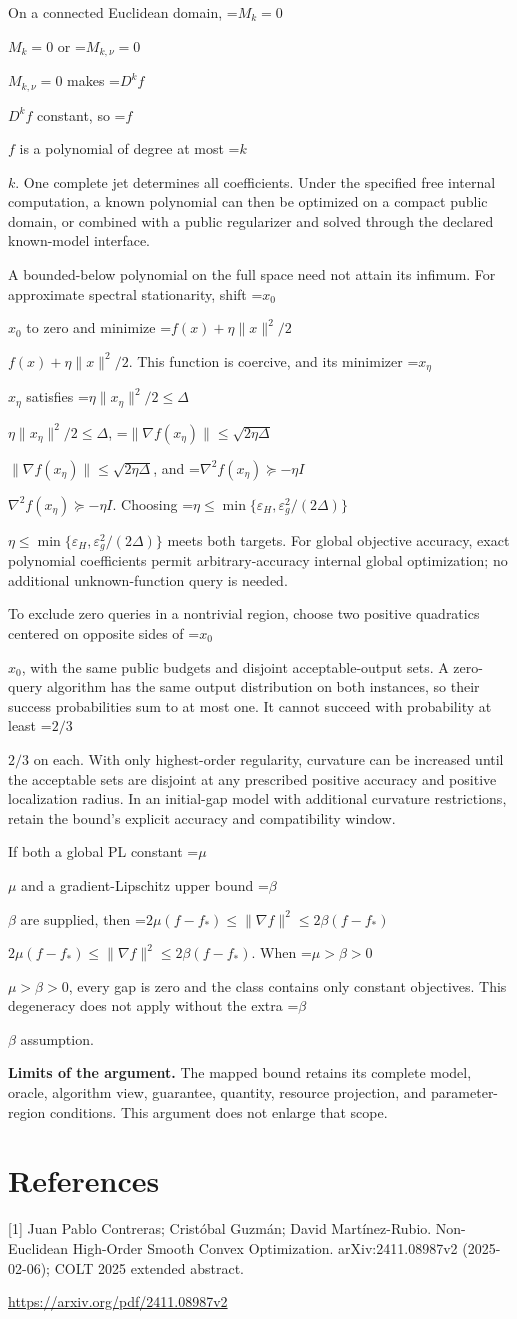 \documentclass[10pt,a4paper]{article}
\newcommand{\AtlasMath}[1]{\par\begingroup\centering\setbox0=\hbox{$\displaystyle #1$}\ifdim\wd0>1.4\linewidth\typeout{ATLAS WIDE FORMULA: \the\wd0}\fi\ifdim\wd0>\linewidth\resizebox{\linewidth}{!}{\box0}\else\box0\fi\par\endgroup}
\newcommand{\AtlasInlineMath}[1]{\begingroup\setbox0=\hbox{$#1$}\ifdim\wd0>.4\linewidth\endgroup\AtlasMath{#1}\else\endgroup$#1$\fi}
\begin{document}
On a connected Euclidean domain, \AtlasInlineMath{M_k=0} or \AtlasInlineMath{M_{k,\nu}=0} makes \AtlasInlineMath{D^kf} constant, so \AtlasInlineMath{f} is a polynomial of degree at most \AtlasInlineMath{k}. One complete jet determines all coefficients. Under the specified free internal computation, a known polynomial can then be optimized on a compact public domain, or combined with a public regularizer and solved through the declared known-model interface.

A bounded-below polynomial on the full space need not attain its infimum. For approximate spectral stationarity, shift \AtlasInlineMath{x_0} to zero and minimize \AtlasInlineMath{f(x)+\eta\|x\|^2/2}. This function is coercive, and its minimizer \AtlasInlineMath{x_\eta} satisfies \AtlasInlineMath{\eta\|x_\eta\|^2/2\le\Delta}, \AtlasInlineMath{\|\nabla f(x_\eta)\|\le\sqrt{2\eta\Delta}}, and \AtlasInlineMath{\nabla^2f(x_\eta)\succeq-\eta I}. Choosing \AtlasInlineMath{\eta\le\min\{\varepsilon_H,\varepsilon_g^2/(2\Delta)\}} meets both targets. For global objective accuracy, exact polynomial coefficients permit arbitrary-accuracy internal global optimization; no additional unknown-function query is needed.

To exclude zero queries in a nontrivial region, choose two positive quadratics centered on opposite sides of \AtlasInlineMath{x_0}, with the same public budgets and disjoint acceptable-output sets. A zero-query algorithm has the same output distribution on both instances, so their success probabilities sum to at most one. It cannot succeed with probability at least \AtlasInlineMath{2/3} on each. With only highest-order regularity, curvature can be increased until the acceptable sets are disjoint at any prescribed positive accuracy and positive localization radius. In an initial-gap model with additional curvature restrictions, retain the bound's explicit accuracy and compatibility window.

If both a global PL constant \AtlasInlineMath{\mu} and a gradient-Lipschitz upper bound \AtlasInlineMath{\beta} are supplied, then \AtlasInlineMath{2\mu(f-f_*)\le\|\nabla f\|^2\le2\beta(f-f_*)}. When \AtlasInlineMath{\mu>\beta>0}, every gap is zero and the class contains only constant objectives. This degeneracy does not apply without the extra \AtlasInlineMath{\beta} assumption.

\textbf{Limits of the argument.} The mapped bound retains its complete model, oracle, algorithm view, guarantee, quantity, resource projection, and parameter-region conditions. This argument does not enlarge that scope.

\section{References}
[1] Juan Pablo Contreras; Cristóbal Guzmán; David Martínez-Rubio. Non-Euclidean High-Order Smooth Convex Optimization. arXiv:2411.08987v2 (2025-02-06); COLT 2025 extended abstract.

\url{https://arxiv.org/pdf/2411.08987v2}
\end{document}
